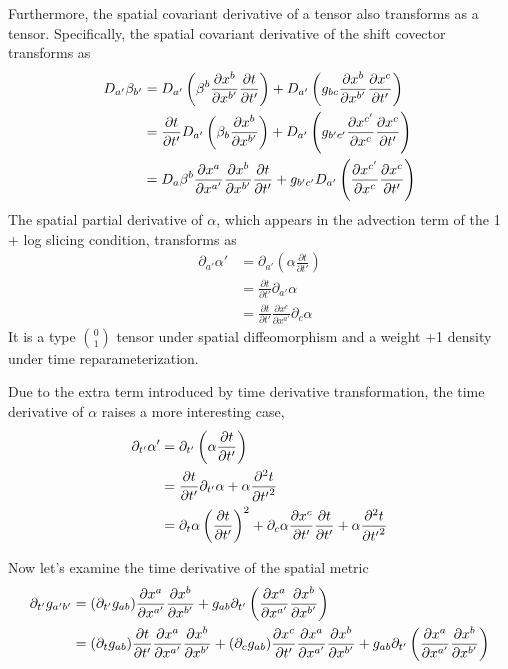 \documentclass[letterpaper,nofootinbib,prd,amsmath,onecolumn]{revtex4-1}
\begin{document}
Furthermore, the spatial covariant derivative of a tensor also transforms as a tensor. Specifically, the spatial covariant derivative of the shift covector transforms as
\begin{align}
D_{a'}\beta_{b'} &= D_{a'}\left(\beta^{b}\frac{\partial x^{b}}{\partial x^{b'}}\frac{\partial t}{\partial t'}\right) + D_{a'}\left(g_{bc}\frac{\partial x^{b}}{\partial x^{b'}}\frac{\partial x^{c}}{\partial t'}\right)\notag\\
& = \frac{\partial t}{\partial t'}D_{a'}\left(\beta_{b}\frac{\partial x^{b}}{\partial x^{b'}}\right) + D_{a'}\left(g_{b'c'}\frac{\partial x^{c'}}{\partial x^{c}}\frac{\partial x^{c}}{\partial t'}\right)\notag\\
& = D_{a}\beta^{b}\frac{\partial x^{a}}{\partial x^{a'}}\frac{\partial x^{b}}{\partial x^{b'}}\frac{\partial t}{\partial t'} + g_{b'c'}D_{a'}\left(\frac{\partial x^{c'}}{\partial x^{c}}\frac{\partial x^{c}}{\partial t'}\right)
\end{align} 
The spatial partial derivative of $\alpha$, which appears in the advection term of the 1 + log slicing condition, transforms as 
\begin{align}
\partial_{a'}\alpha' & = \partial_{a'}\left(\alpha \frac{\partial t}{\partial t'}\right)\\
& = \frac{\partial t}{\partial t'}\partial_{a'}\alpha\\
& = \frac{\partial t}{\partial t'}\frac{\partial x^{c}}{\partial x^{a'}}\partial_{c}\alpha
\end{align}
It is a type $0 \choose 1$ tensor under spatial diffeomorphism and a weight +1 density under time reparameterization.

Due to the extra term introduced by time derivative transformation, the time derivative of $\alpha$ raises a more interesting case, 
\begin{align}
\partial_{t'}\alpha' & = \partial_{t'}\left(\alpha\frac{\partial t}{\partial t'}\right)\notag\\
& = \frac{\partial t}{\partial t'}\partial_{t'}\alpha + \alpha\frac{\partial^{2}t}{\partial {t'}^{2}}\notag\\
& = \partial_{t}\alpha\left(\frac{\partial t}{\partial t'}\right)^{2} + \partial_{c}\alpha\frac{\partial x^{c}}{\partial t'}\frac{\partial t}{\partial t'} + \alpha\frac{\partial^{2}t}{\partial {t'}^{2}}
\end{align}

Now let's examine the time derivative of the spatial metric
\begin{align}
\partial_{t'}g_{a'b'} & = (\partial_{t'}g_{ab})\frac{\partial x^{a}}{\partial x^{a'}}\frac{\partial x^{b}}{\partial x^{b'}} + g_{ab}\partial_{t'}\left(\frac{\partial x^{a}}{\partial x^{a'}}\frac{\partial x^{b}}{\partial x^{b'}}\right)\notag\\
& =  (\partial_{t}g_{ab})\frac{\partial t}{\partial t'}\frac{\partial x^{a}}{\partial x^{a'}}\frac{\partial x^{b}}{\partial x^{b'}} + (\partial_{c}g_{ab})\frac{\partial x^{c}}{\partial t'}\frac{\partial x^{a}}{\partial x^{a'}}\frac{\partial x^{b}}{\partial x^{b'}} + g_{ab}\partial_{t'}\left(\frac{\partial x^{a}}{\partial x^{a'}}\frac{\partial x^{b}}{\partial x^{b'}}\right)
\end{align}
\end{document}
